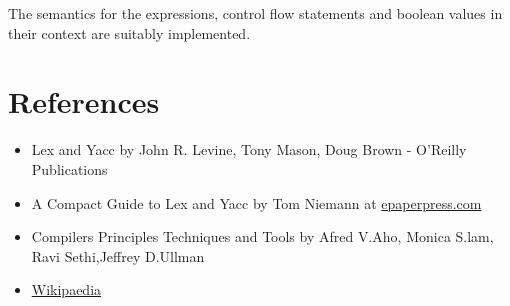 \documentclass[12pt, oneside, a4paper]{article}
\begin{document}
The semantics for the expressions,  control flow statements and boolean values in their context are suitably implemented.

\section{References}
\begin{itemize}
\item Lex and Yacc by John R. Levine, Tony Mason, Doug Brown - O’Reilly Publications
\item A Compact Guide to Lex and Yacc by Tom Niemann at \href{http://epaperpress.com}{epaperpress.com}
\item Compilers Principles Techniques and Tools by Afred V.Aho, Monica S.lam, Ravi Sethi,Jeffrey D.Ullman
\item \href{http://en.wikipaedia.org/wiki/Syntax analysis}{Wikipaedia}
\end{itemize}
\end{document}
